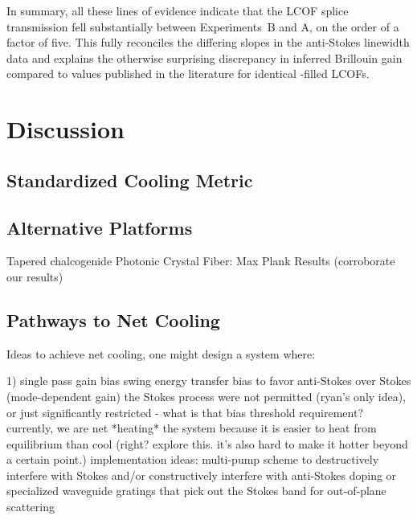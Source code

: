 In summary, all these lines of evidence indicate that the \ac{LCOF} splice transmission fell substantially between Experiments~B and A, on the order of a factor of five. This fully reconciles the differing slopes in the anti‐Stokes linewidth data and explains the otherwise surprising discrepancy in inferred Brillouin gain compared to values published in the literature for identical -filled \ac{LCOF}s.


\section{Discussion}
\label{Cooling:sec:Discussion}

\subsection{Standardized Cooling Metric}
\label{Cooling:subsec:StandardizedCoolingMetric}


\subsection{Alternative Platforms}
\label{Cooling:subsec:AlternativePlatforms}

Tapered chalcogenide Photonic Crystal Fiber: Max Plank Results (corroborate our results)

\subsection{Pathways to Net Cooling}
\label{Cooling:subsec:PathwaystoNetCooling}

Ideas to achieve net cooling, one might design a system where:

1) single pass gain bias
     swing energy transfer bias to favor anti-Stokes over Stokes (mode-dependent gain)
     the Stokes process were not permitted (ryan's only idea), or just significantly restricted - what is that bias threshold requirement?
     currently, we are net *heating* the system because it is easier to heat from equilibrium than cool (right? explore this. it's also hard to make it hotter beyond a certain point.)
     implementation ideas:
       multi-pump scheme to destructively interfere with Stokes and/or constructively interfere with anti-Stokes
       doping or specialized waveguide gratings that pick out the Stokes band for out-of-plane scattering

